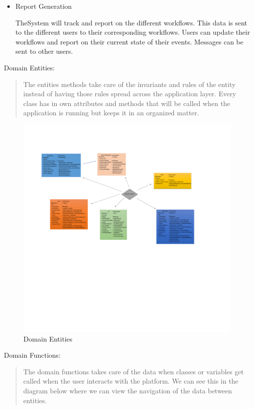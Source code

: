 \documentclass{article}
\begin{document}
\begin{itemize}
    \item Report Generation

    \vspace{5}
    TheSystem will track and report on the different workflows.
    This data is sent to the different users to their corresponding workflows.
    Users can
    update their workflows and report on their current state of their events.
    Messages can be sent to other users.
\end{itemize}
\vspace{5}
Domain Entities:
\begin{quotation}
    The entities methods take care of the invariants and rules of the entity instead of having those rules spread across the application layer.
    Every class has in own attributes and methods that will be called when the application is running but keeps it in an organized matter.
\end{quotation}
\bigbreak
\begin{figure}[ht!]
    \centering
    \includegraphics[width=1.2\columnwidth]{Images/Domain_Entities.pdf}
    \caption{Domain Entities}
    \label{fig:figure}
\end{figure}
\bigbreak
Domain Functions:
\begin{quotation}
    The domain functions takes care of the data when classes or variables get called when the user interacts with the platform.
    We can see this in the diagram below where we can view the navigation of the data between entities.
\end{quotation}
\end{document}
